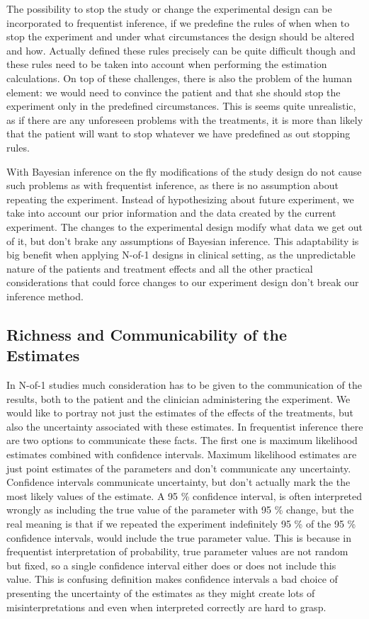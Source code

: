 \documentclass[12pt,a4paper,leqno]{report}
\theoremstyle{plain}
\theoremstyle{definition}
\theoremstyle{remark}
\begin{document}
The possibility to stop the study or change the experimental design can be incorporated to frequentist inference,
if we predefine the rules of when when to stop the experiment and under what circumstances the design
should be altered and how. Actually defined these rules precisely can be quite difficult though and these rules
need to be taken into account when performing the estimation calculations. On top of these challenges, there is
also the problem of the human element: we would need to convince the patient and that she should stop the experiment
only in the predefined circumstances. This is seems quite unrealistic, as if there are any unforeseen problems with
the treatments, it is more than likely that the patient will want to stop whatever we have predefined as out stopping rules.

With Bayesian inference on the fly modifications of the study design do not cause such problems as with frequentist inference,
as there is no assumption about repeating the experiment. Instead of hypothesizing about future experiment, we
take into account our prior information and the data created by the current experiment. The changes to the
experimental design modify what data we get out of it, but don't brake any assumptions of Bayesian inference.
This adaptability is big benefit when applying N-of-1 designs in clinical setting, as the unpredictable
nature of the patients and treatment effects and all the other practical considerations that could
force changes to our experiment design don't break our inference method.

\subsection{Richness and Communicability of the Estimates}\label{whybayes}

In N-of-1 studies much consideration has to be given to the communication of the results, both to
the patient and the clinician administering the experiment. We would like to portray not just
the estimates of the effects of the treatments, but also the uncertainty associated with these estimates.
In frequentist inference there are two options to communicate these facts. The first one is maximum likelihood
estimates combined with confidence intervals. Maximum likelihood estimates are just point estimates of the
parameters and don't communicate any uncertainty. Confidence intervals communicate uncertainty, but
don't actually mark the the most likely values of the estimate. A 95 \% confidence interval, is often
interpreted wrongly as including the true value of the parameter with 95 \% change, but the real meaning
is that if we repeated the experiment indefinitely 95 \% of the 95 \% confidence intervals, would include the
true parameter value. This is because in frequentist interpretation of probability, true parameter values are
not random but fixed, so a single confidence interval either does or does not include this value. This is
confusing definition makes confidence intervals a bad choice of presenting the uncertainty of the
estimates as they might create lots of misinterpretations and even when interpreted correctly are hard to grasp.
\end{document}
